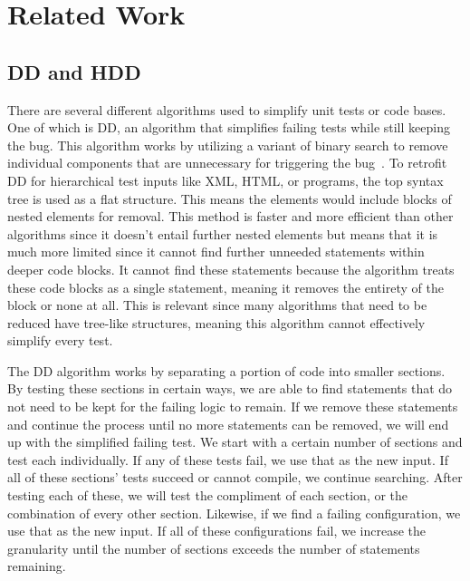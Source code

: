 \clearpage %

\chapter{Related Work}\label{CH2_RelatedWork}

\section{DD and HDD}
There are several different algorithms used to simplify unit tests or code bases. One of which is DD, an algorithm that simplifies failing tests while still keeping the bug. This algorithm works by utilizing a variant of binary search to remove individual components that are unnecessary for triggering the bug~\cite{zeller2002simplifying}. To retrofit DD for hierarchical test inputs like XML, HTML, or programs, the top syntax tree is used as a flat structure. This means the elements would include blocks of nested elements for removal. This method is faster and more efficient than other algorithms since it doesn't entail further nested elements but means that it is much more limited since it cannot find further unneeded statements within deeper code blocks. It cannot find these statements because the algorithm treats these code blocks as a single statement, meaning it removes the entirety of the block or none at all. This is relevant since many algorithms that need to be reduced have tree-like structures, meaning this algorithm cannot effectively simplify every test.

The DD algorithm works by separating a portion of code into smaller sections. By testing these sections in certain ways, we are able to find statements that do not need to be kept for the failing logic to remain. If we remove these statements and continue the process until no more statements can be removed, we will end up with the simplified failing test. We start with a certain number of sections and test each individually. If any of these tests fail, we use that as the new input. If all of these sections' tests succeed or cannot compile, we continue searching. After testing each of these, we will test the compliment of each section, or the combination of every other section. Likewise, if we find a failing configuration, we use that as the new input. If all of these configurations fail, we increase the granularity until the number of sections exceeds the number of statements remaining.

